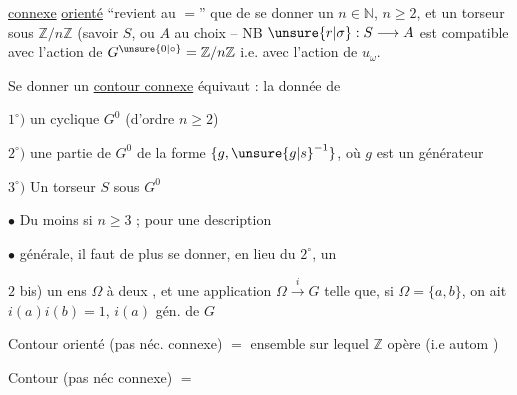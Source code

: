 \uline{connexe} \uline{orienté} ``revient au $=$'' que de se donner un $n\in\mathbb{N}$, $n\geq2$, et un  torseur sous $\mathbb{Z}/n\mathbb{Z}$ (savoir $S$, ou $A$ au choix -- NB $\unsure{r|\sigma}:S\longrightarrow A$ est compatible avec l'action de $G^{\unsure{0|\circ}}=\mathbb{Z}/n\mathbb{Z}$ i.e. avec l'action de $u_{\omega}$.

Se donner un \uline{contour connexe} équivaut : la donnée de

$1^{\circ})$ un  cyclique $G^{0}$ (d'ordre $n\geq2$)

$2^{\circ})$ une  partie de $G^{0}$  de la forme $\{g,\unsure{g|s}^{-1}\}$, où $g$ est un générateur 

$3^{\circ})$ Un torseur $S$ sous $G^{0}$

$\bullet$ Du moins si $n\geq3$  ; pour une description

$\bullet$ générale, il faut de plus se donner, en lieu du $2^{\circ}$, un

$2$ bis) un ens $\Omega$ à deux , et une application $\Omega\xrightarrow{i}G$ telle que, si $\Omega=\{a,b\}$, on ait $i(a)i(b)=1$, $i(a)$ gén. de $G$


Contour orienté (pas néc. connexe) $=$ ensemble sur lequel $\mathbb{Z}$ opère (i.e  autom )

Contour (pas néc connexe) $=$ 
